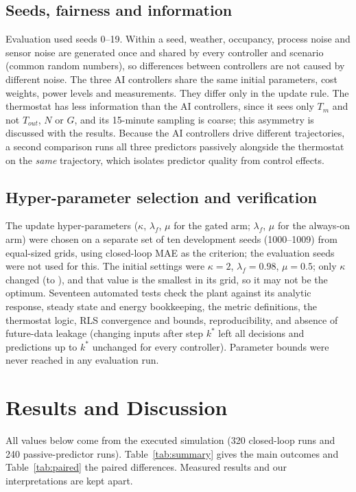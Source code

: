 \documentclass[conference]{IEEEtran}
\begin{document}
\subsection{Seeds, fairness and information}
Evaluation used seeds 0--19. Within a seed, weather, occupancy, process noise and sensor noise are generated once and shared by every controller and scenario (common random numbers), so differences between controllers are not caused by different noise. The three AI controllers share the same initial parameters, cost weights, power levels and measurements. They differ only in the update rule. The thermostat has less information than the AI controllers, since it sees only $T_m$ and not $T_{out}$, $N$ or $G$, and its 15-minute sampling is coarse; this asymmetry is discussed with the results. Because the AI controllers drive different trajectories, a second comparison runs all three predictors passively alongside the thermostat on the \emph{same} trajectory, which isolates predictor quality from control effects.

\subsection{Hyper-parameter selection and verification}
The update hyper-parameters ($\kappa$, $\lambda_f$, $\mu$ for the gated arm; $\lambda_f$, $\mu$ for the always-on arm) were chosen on a separate set of ten development seeds (1000--1009) from equal-sized grids, using closed-loop MAE as the criterion; the evaluation seeds were not used for this. The initial settings were $\kappa=2$, $\lambda_f=0.98$, $\mu=0.5$; only $\kappa$ changed (to \TauOn), and that value is the smallest in its grid, so it may not be the optimum. Seventeen automated tests check the plant against its analytic response, steady state and energy bookkeeping, the metric definitions, the thermostat logic, RLS convergence and bounds, reproducibility, and absence of future-data leakage (changing inputs after step $k^{*}$ left all decisions and predictions up to $k^{*}$ unchanged for every controller). Parameter bounds were never reached in any evaluation run.

\section{Results and Discussion}
All values below come from the executed simulation (320 closed-loop runs and 240 passive-predictor runs). Table~\ref{tab:summary} gives the main outcomes and Table~\ref{tab:paired} the paired differences. Measured results and our interpretations are kept apart.
\end{document}
